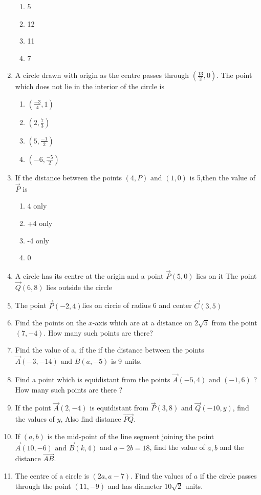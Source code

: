 \begin{enumerate}[label=\thesubsection.\arabic*,ref=\thesubsection.\theenumi]
\begin{enumerate}
\item 5
\item 12
\item 11
\item 7
\end{enumerate}
\item A circle drawn with origin as the
centre passes through 
$(\frac{13}{2},0)$. The
point which does not lie in the
interior of the circle is
\begin{enumerate}
\item $(\frac{-3}{4},1)$
\item $(2,\frac{7}{3})$
\item $(5,\frac{-1}{2})$
\item $(-6,\frac{-5}{2})$
\end{enumerate}
\item If the distance between the points $(4,P) \text{ and } (1,0)$ is 5,then the value of $\vec{P}$ is
\begin{enumerate}                       
\item4 only
\item+4 only
\item-4 only
\item0
\end{enumerate}
\item A circle has its centre at the origin and a point $\vec{P}(5,0)$ lies on it The point $\vec{Q}(6,8)$ lies outside the circle
 \item The point $\vec{P}(-2,4)$lies on circie of radius 6 and center $\vec{C}(3,5)$
\item Find the points on the $x$-axis which are at a distance on $2\sqrt{5}$ from the point$ (7,-4).$ How many such points are there?
\item Find the value of a, if the if the distance between the points $\vec{A}(-3,-14) \text{ and }{B}(a,-5)$ is 9 units.
\item Find a point which is equidistant from the points $\vec{A}(-5,4) \text{ and }(-1,6)$ ? How many such points are there ?
\item If the point $\vec{A}(2,-4)$ is equidistant from $\vec{P}(3,8) \text{ and }\vec{Q}(-10,y)$, find the values of $y$, Also find distance $\vec{PQ}$.
\item If $(a,b)$ is the mid-point of the line segment joining the point $\vec{A}(10,-6)\text{ and }\vec{B}(k,4)$ and $a-2b=18$, find the value of $a,b$ and the distance $\vec{AB}$.
\item The centre of a circle is $(2a,a-7)$. Find the values of $a$ if the circle passes through the point $(11,-9)$ and has diameter $10\sqrt{2}$ units.

\end{enumerate}

